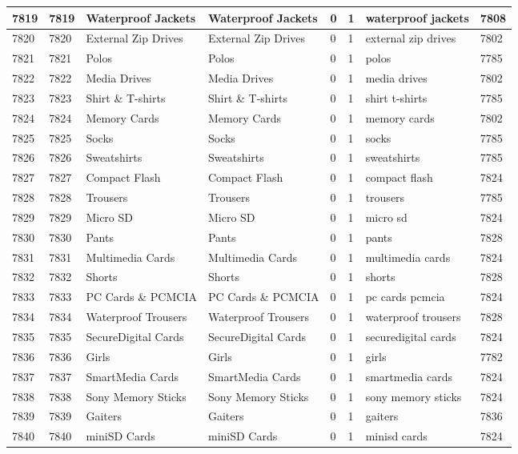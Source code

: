 \begin{longtable}{|l|l|l|l|l|l|l|l|}
7819 & 7819 & Waterproof Jackets & Waterproof Jackets & 0 & 1 & waterproof jackets & 7808 \\ \hline 
7820 & 7820 & External Zip Drives & External Zip Drives & 0 & 1 & external zip drives & 7802 \\ \hline 
7821 & 7821 & Polos & Polos & 0 & 1 & polos & 7785 \\ \hline 
7822 & 7822 & Media Drives & Media Drives & 0 & 1 & media drives & 7802 \\ \hline 
7823 & 7823 & Shirt \& T-shirts & Shirt \& T-shirts & 0 & 1 & shirt t-shirts & 7785 \\ \hline 
7824 & 7824 & Memory Cards & Memory Cards & 0 & 1 & memory cards & 7802 \\ \hline 
7825 & 7825 & Socks & Socks & 0 & 1 & socks & 7785 \\ \hline 
7826 & 7826 & Sweatshirts & Sweatshirts & 0 & 1 & sweatshirts & 7785 \\ \hline 
7827 & 7827 & Compact Flash & Compact Flash & 0 & 1 & compact flash & 7824 \\ \hline 
7828 & 7828 & Trousers & Trousers & 0 & 1 & trousers & 7785 \\ \hline 
7829 & 7829 & Micro SD & Micro SD & 0 & 1 & micro sd & 7824 \\ \hline 
7830 & 7830 & Pants & Pants & 0 & 1 & pants & 7828 \\ \hline 
7831 & 7831 & Multimedia Cards & Multimedia Cards & 0 & 1 & multimedia cards & 7824 \\ \hline 
7832 & 7832 & Shorts & Shorts & 0 & 1 & shorts & 7828 \\ \hline 
7833 & 7833 & PC Cards \& PCMCIA & PC Cards \& PCMCIA & 0 & 1 & pc cards pcmcia & 7824 \\ \hline 
7834 & 7834 & Waterproof Trousers & Waterproof Trousers & 0 & 1 & waterproof trousers & 7828 \\ \hline 
7835 & 7835 & SecureDigital Cards & SecureDigital Cards & 0 & 1 & securedigital cards & 7824 \\ \hline 
7836 & 7836 & Girls & Girls & 0 & 1 & girls & 7782 \\ \hline 
7837 & 7837 & SmartMedia Cards & SmartMedia Cards & 0 & 1 & smartmedia cards & 7824 \\ \hline 
7838 & 7838 & Sony Memory Sticks & Sony Memory Sticks & 0 & 1 & sony memory sticks & 7824 \\ \hline 
7839 & 7839 & Gaiters & Gaiters & 0 & 1 & gaiters & 7836 \\ \hline 
7840 & 7840 & miniSD Cards & miniSD Cards & 0 & 1 & minisd cards & 7824 \\ \hline 

\end{longtable}
